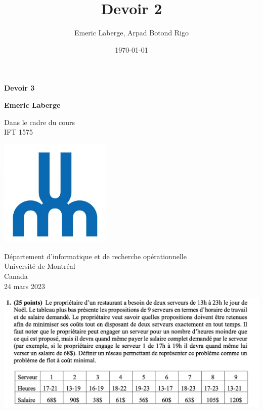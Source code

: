 \documentclass{article}
\title{Devoir 2}
\author{Emeric Laberge, Arpad Botond Rigo}
\date{\today}
\begin{document}
\begin{titlepage}
\begin{center}
\vspace*{1cm}

\Huge
\textbf{Devoir 3}

\vspace{0.5cm}
\LARGE

\vspace{1.5cm}

\textbf{Emeric Laberge}

\vfill

Dans le cadre du cours\\
IFT 1575 


\vspace{0.8cm}

\includegraphics[width=0.4\textwidth]{Université-de-Montréal.jpg}

\Large
Département d'informatique et de recherche opérationnelle\\
Université de Montréal\\
Canada\\
24 mars 2023 

\end{center}
\end{titlepage}


\includegraphics[width=1 \textwidth]{num1} 
\pagebreak
\end{document}
